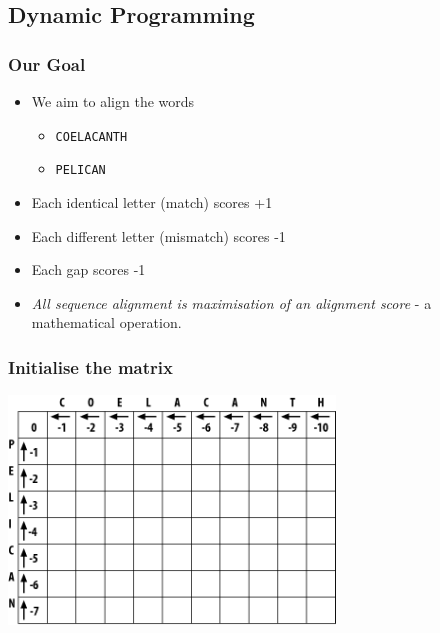 %

\subsection{Dynamic Programming}
  \begin{frame}
  \frametitle{Our Goal}
  \begin{itemize}
    \item<1-> We aim to align the words
    \begin{itemize}
      \item<1-> \texttt{COELACANTH}
      \item<1-> \texttt{PELICAN}
    \end{itemize}
    \item<2-> Each identical letter (match) scores +1
    \item<2-> Each different letter (mismatch) scores -1
    \item<2-> Each gap scores -1
    \item<3-> \emph{All sequence alignment is maximisation of an alignment score} - a mathematical operation.
  \end{itemize}
\end{frame}   
   
\begin{frame}
  \frametitle{Initialise the matrix}
  \begin{center}
    \includegraphics[width=0.65\textwidth]{images/initialise}
    \end{center}
\end{frame}   
   
